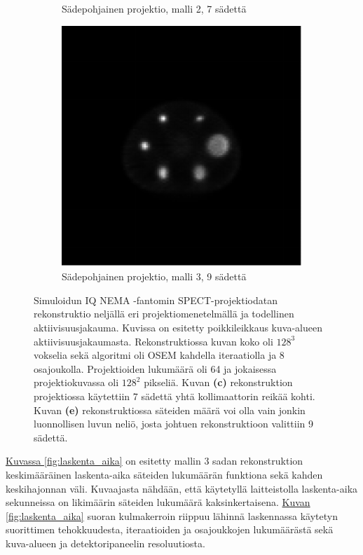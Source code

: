 \begin{figure}[H]
\begin{subfigure}[b]{.25\textwidth}
        \caption{Sädepohjainen projektio, malli 2, 7 sädettä}
    \end{subfigure}%
    \hspace{.075\textwidth}%
    \begin{subfigure}[b]{.25\textwidth}
        \includegraphics[width=\linewidth]{kuvat/nema_rekonstruktio_proj1_malli3_nRay9.pdf}
        \caption{Sädepohjainen projektio, malli 3, 9 sädettä}
    \end{subfigure}
    \caption{Simuloidun IQ NEMA -fantomin SPECT-projektiodatan rekonstruktio neljällä eri projektiomenetelmällä ja todellinen aktiivisuusjakauma. Kuvissa on esitetty poikkileikkaus kuva-alueen aktiivisuusjakaumasta. Rekonstruktiossa kuvan koko oli $128^3$ vokselia sekä algoritmi oli OSEM kahdella iteraatiolla ja 8 osajoukolla. Projektioiden lukumäärä oli 64 ja jokaisessa projektiokuvassa oli $128^2$ pikseliä. Kuvan \textbf{(c)} rekonstruktion projektiossa käytettiin 7 sädettä yhtä kollimaattorin reikää kohti. Kuvan \textbf{(e)} rekonstruktiossa säteiden määrä voi olla vain jonkin luonnollisen luvun neliö, josta johtuen rekonstruktioon valittiin 9 sädettä.}
    \label{fig:rekonstruktiot}
\end{figure}

\hyperref[fig:laskenta_aika]{Kuvassa \ref*{fig:laskenta_aika}} on esitetty mallin 3 sadan rekonstruktion keskimääräinen laskenta-aika säteiden lukumäärän funktiona sekä kahden keskihajonnan väli. Kuvaajasta nähdään, että käytetyllä laitteistolla laskenta-aika sekunneissa on likimäärin säteiden lukumäärä kaksinkertaisena. \hyperref[fig:laskenta_aika]{Kuvan \ref*{fig:laskenta_aika}} suoran kulmakerroin riippuu lähinnä laskennassa käytetyn suorittimen tehokkuudesta, iteraatioiden ja osajoukkojen lukumäärästä sekä kuva-alueen ja detektoripaneelin resoluutiosta.

